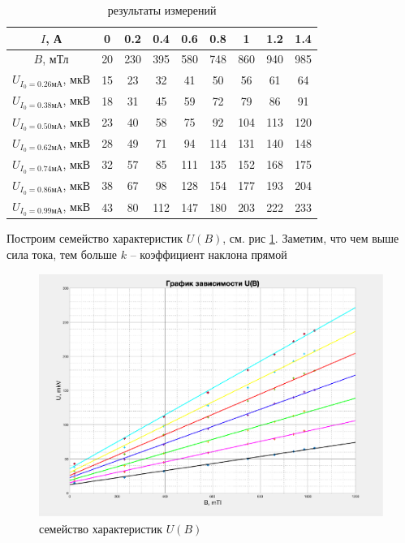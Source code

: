 \documentclass[a4paper,14pt]{article}
\begin{document}
\begin{table}[hbt!]
	\begin{center}
	\begin{tabular}{|c|c|c|c|c|c|c|c|c|}
		\hline
		$I$, А                         & 0  & 0.2 & 0.4 & 0.6 & 0.8 & 1   & 1.2 & 1.4 \\ \hline
		$B$, мТл                       & 20 & 230 & 395 & 580 & 748 & 860 & 940 & 985 \\ \hline
		$U_{I_0 = 0.26 \text{мА}}$, мкВ & 15 & 23  & 32  & 41  & 50  & 56  & 61  & 64  \\ \hline
			$U_{I_0 = 0.38 \text{мА}}$, мкВ & 18 & 31  & 45  & 59  & 72  & 79  & 86  & 91  \\ \hline
				$U_{I_0 = 0.50 \text{мА}}$, мкВ & 23 & 40  & 58  & 75  & 92  & 104 & 113 & 120 \\ \hline
					$U_{I_0 = 0.62 \text{мА}}$, мкВ & 28 & 49  & 71  & 94  & 114 & 131 & 140 & 148 \\ \hline
						$U_{I_0 = 0.74 \text{мА}}$, мкВ & 32 & 57  & 85  & 111 & 135 & 152 & 168 & 175 \\ \hline
							$U_{I_0 = 0.86 \text{мА}}$, мкВ & 38 & 67  & 98  & 128 & 154 & 177 & 193 & 204 \\ \hline
								$U_{I_0 = 0.99 \text{мА}}$, мкВ & 43 & 80  & 112 & 147 & 180 & 203 & 222 & 233 \\ \hline
								\end{tabular}
						\caption{результаты измерений}
					\label{tab2}
				\end{center}
			\end{table}

Построим семейство характеристик $U(B)$, см. рис \ref{gr2}. Заметим, что чем выше сила тока, тем больше $k$ -- коэффициент наклона прямой

\begin{center}
	\begin{figure}[bhtp!]
		\centering
		\includegraphics[width=0.7\linewidth]{gr2.pdf}
		\caption{семейство характеристик $U(B)$}
		\label{gr2}
	\end{figure}
\end{center}
\end{document}
